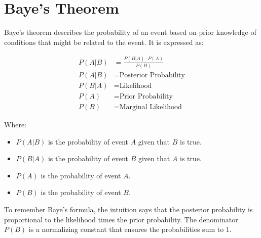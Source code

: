 \documentclass{article}
\begin{document}
\section*{Baye's Theorem}
Baye's theorem describes the probability of an event based on prior knowledge of conditions that might be related to the event. It is expressed as:
\begin{tcolorbox}[colback=white!10!white, colframe=navyblue!75!black, title=Baye's Theorem]
\begin{align*}
P(A|B) &= \frac{P(B|A) \cdot P(A)}{P(B)} \\
P(A|B) &= \text{Posterior Probability} \\
P(B|A) &= \text{Likelihood} \\
P(A) &= \text{Prior Probability} \\
P(B) &= \text{Marginal Likelihood}
\end{align*}
\end{tcolorbox}
Where:
\begin{itemize}
    \item $P(A|B)$ is the probability of event $A$ given that $B$ is true.
    \item $P(B|A)$ is the probability of event $B$ given that $A$ is true.
    \item $P(A)$ is the probability of event $A$.
    \item $P(B)$ is the probability of event $B$.
\end{itemize}
To remember Baye's formula, the intuition says that the posterior probability is proportional to the likelihood times the prior probability. The denominator $P(B)$ is a normalizing constant that ensures the probabilities sum to 1.
\end{document}
